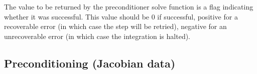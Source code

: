 {
  The value to be returned by the preconditioner solve function is a flag
  indicating whether it was successful.  This value should be $0$ if successful, 
  positive for a recoverable error (in which case the step will be retried),     
  negative for an unrecoverable error (in which case the integration is halted). 
}
{}

\subsection{Preconditioning (Jacobian data)}\label{ss:precondFn}

